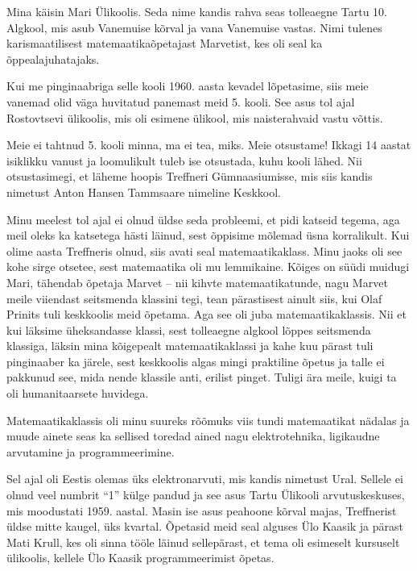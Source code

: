 

Mina käisin Mari Ülikoolis. Seda 
nime kandis rahva seas tolleaegne Tartu 10. Algkool, mis asub Vanemuise
kõrval ja vana Vanemuise vastas. Nimi tulenes karismaatilisest
matemaatikaõpetajast Marvetist, kes oli seal ka õppealajuhatajaks.

Kui me pinginaabriga selle kooli 1960. aasta kevadel lõpetasime, siis
meie vanemad olid väga huvitatud panemast meid 5. kooli. See asus tol ajal Rostovtsevi ülikoolis, mis oli esimene
ülikool, mis naisterahvaid vastu võttis.

Meie ei tahtnud 5. kooli minna, ma ei tea, miks. Meie otsustame!
Ikkagi 14 aastat isiklikku vanust ja loomulikult tuleb ise otsustada, kuhu kooli
lähed. Nii otsustasimegi, et läheme hoopis
Treffneri Gümnaasiumisse, mis siis kandis
nimetust Anton Hansen Tammsaare nimeline Keskkool.

Minu meelest tol ajal ei
olnud üldse seda probleemi, et pidi katseid tegema, aga
meil oleks ka katsetega hästi läinud, sest õppisime mõlemad üsna
korralikult. Kui olime aasta Treffneris olnud, siis avati seal
matemaatikaklass. Minu jaoks oli see kohe sirge otsetee, sest
matemaatika oli mu lemmikaine. Kõiges on süüdi muidugi Mari, tähendab õpetaja
Marvet -- nii kihvte matemaatikatunde,
nagu Marvet meile viiendast seitsmenda klassini tegi, tean pärastisest ainult siis,
kui Olaf Prinits tuli keskkoolis meid õpetama. Aga
see oli juba matemaatikaklassis. Nii et kui läksime üheksandasse klassi, sest
tolleaegne algkool lõppes seitsmenda klassiga, läksin mina kõigepealt matemaatikaklassi ja kahe kuu pärast tuli pinginaaber ka järele, sest
keskkoolis algas mingi praktiline õpetus ja talle ei pakkunud see, mida nende
klassile anti, erilist pinget. Tuligi ära meile,
kuigi ta oli humanitaarsete huvidega.

Matemaatikaklassis oli minu suureks rõõmuks viis tundi matemaatikat nädalas
ja muude ainete seas ka sellised toredad ained nagu elektrotehnika, ligikaudne
arvutamine ja programmeerimine.


Sel ajal oli Eestis olemas üks elektronarvuti, mis kandis
nimetust Ural. Sellele ei olnud veel numbrit \enquote{1} külge
pandud ja see asus Tartu Ülikooli arvutuskeskuses, mis moodustati 1959. aastal. Masin ise asus peahoone
kõrval majas, Treffnerist üldse mitte kaugel, üks kvartal.
Õpetasid meid seal alguses Ülo Kaasik ja pärast Mati
Krull, kes oli sinna tööle läinud sellepärast,
et tema oli esimeselt kursuselt ülikoolis, kellele Ülo Kaasik programmeerimist õpetas.

